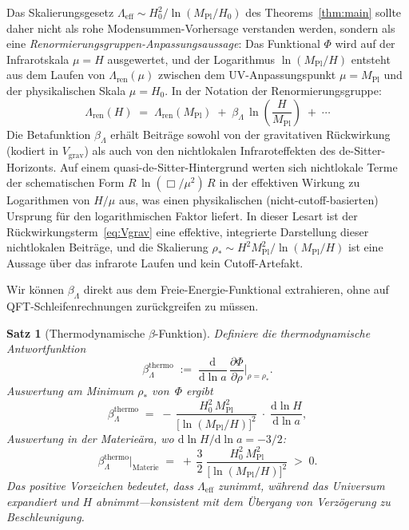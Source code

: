 \documentclass[12pt,a4paper]{article}
\theoremstyle{definition}
\theoremstyle{plain}
\newtheorem{proposition}[definition]{Satz}
\theoremstyle{remark}
\newcommand{\Leff}{\Lambda_{\mathrm{eff}}}
\newcommand{\dd}{\mathrm{d}}
\begin{document}
Das Skalierungsgesetz $\Leff \sim H_0^2/\ln(M_{\mathrm{Pl}}/H_0)$
des Theorems~\ref{thm:main} sollte daher nicht als rohe
Modensummen-Vorhersage verstanden werden, sondern als eine
\emph{Renormierungsgruppen-Anpassungsaussage}: Das Funktional $\Phi$
wird auf der Infrarotskala $\mu = H$ ausgewertet, und der Logarithmus
$\ln(M_{\mathrm{Pl}}/H)$ entsteht aus dem Laufen von
$\Lambda_{\mathrm{ren}}(\mu)$ zwischen dem UV-Anpassungspunkt
$\mu = M_{\mathrm{Pl}}$ und der physikalischen Skala $\mu = H_0$.
In der Notation der Renormierungsgruppe:
\begin{equation}\label{eq:RG-running}
  \Lambda_{\mathrm{ren}}(H)
  \;=\; \Lambda_{\mathrm{ren}}(M_{\mathrm{Pl}})
  \;+\; \beta_\Lambda\,\ln\!\left(\frac{H}{M_{\mathrm{Pl}}}\right)
  \;+\; \cdots
\end{equation}
Die Betafunktion $\beta_\Lambda$ erh\"alt Beitr\"age sowohl von der
gravitativen R\"uckwirkung (kodiert in $V_{\mathrm{grav}}$) als auch
von den nichtlokalen Infraroteffekten des de-Sitter-Horizonts. Auf
einem quasi-de-Sitter-Hintergrund werten sich nichtlokale Terme der
schematischen Form $R\,\ln(\Box/\mu^2)\,R$ in der effektiven Wirkung
zu Logarithmen von $H/\mu$ aus, was einen physikalischen
(nicht-cutoff-basierten) Ursprung f\"ur den logarithmischen Faktor
liefert. In dieser Lesart ist der
R\"uckwirkungsterm~\eqref{eq:Vgrav} eine effektive, integrierte
Darstellung dieser nichtlokalen Beitr\"age, und die Skalierung
$\rho_\ast \sim H^2 M_{\mathrm{Pl}}^2/\ln(M_{\mathrm{Pl}}/H)$ ist
eine Aussage \"uber das infrarote Laufen und kein Cutoff-Artefakt.

Wir k\"onnen $\beta_\Lambda$ direkt aus dem Freie-Energie-Funktional
extrahieren, ohne auf QFT-Schleifenrechnungen zur\"uckgreifen zu m\"ussen.

\begin{proposition}[Thermodynamische $\beta$-Funktion]\label{prop:beta-Lambda}
Definiere die thermodynamische Antwortfunktion
\begin{equation}\label{eq:beta-thermo}
  \beta_\Lambda^{\mathrm{thermo}}
  \;:=\;
  \frac{\dd}{\dd\ln a}\,
  \frac{\partial\Phi}{\partial\rho}\bigg|_{\rho=\rho_\ast}.
\end{equation}
Auswertung am Minimum $\rho_\ast$ von~$\Phi$ ergibt
\begin{equation}\label{eq:beta-explicit}
  \beta_\Lambda^{\mathrm{thermo}}
  \;=\;
  -\,\frac{H_0^2\,M_{\mathrm{Pl}}^2}{\bigl[\ln(M_{\mathrm{Pl}}/H)\bigr]^2}
  \;\cdot\; \frac{\dd\ln H}{\dd\ln a},
\end{equation}
Auswertung in der Materie\"ara, wo $\dd\ln H/\dd\ln a = -3/2$:
\begin{equation}
  \beta_\Lambda^{\mathrm{thermo}}\Big|_{\mathrm{Materie}}
  \;=\;
  +\,\frac{3}{2}\;\frac{H_0^2\,M_{\mathrm{Pl}}^2}
  {\bigl[\ln(M_{\mathrm{Pl}}/H)\bigr]^2}
  \;>\; 0.
\end{equation}
Das positive Vorzeichen bedeutet, dass $\Leff$ zunimmt, w\"ahrend das
Universum expandiert und $H$ abnimmt---konsistent mit dem \"Ubergang
von Verz\"ogerung zu Beschleunigung.
\end{proposition}
\end{document}
